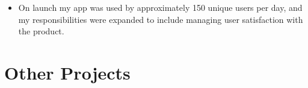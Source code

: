 \documentclass[letterpaper]{article}
\begin{document}
\begin{itemize}
\begin{itemize}
            \item On launch my app was used by approximately 150 unique users
                per day, and my responsibilities were expanded to include
                managing user satisfaction with the product.

\end{itemize}
	
%
%
	
%
%
\end{itemize}

\section*{Other Projects}
\end{document}
